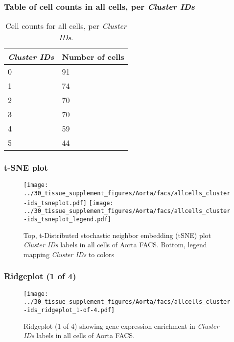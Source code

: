 \subsubsection{Table of cell counts in all cells, per \emph{Cluster IDs}}\begin{table}[h]
\centering
\label{my-label}
\begin{tabular}{@{}ll@{}}
\toprule

\emph{Cluster IDs}& Number of cells \\ \midrule
0 & 91 \\

1 & 74 \\

2 & 70 \\

3 & 70 \\

4 & 59 \\

5 & 44 \\
\bottomrule
\end{tabular}
\caption{Cell counts for all cells, per \emph{Cluster IDs}.}
\end{table}

\clearpage
\subsubsection{t-SNE plot}
\begin{figure}[h]
\centering
\texttt{[image: ../30\_tissue\_supplement\_figures/Aorta/facs/allcells\_cluster-ids\_tsneplot.pdf]}
\texttt{[image: ../30\_tissue\_supplement\_figures/Aorta/facs/allcells\_cluster-ids\_tsneplot\_legend.pdf]}
\caption{Top, t-Distributed stochastic neighbor embedding (tSNE) plot  \emph{Cluster IDs} labels in all cells of Aorta FACS. Bottom, legend mapping \emph{Cluster IDs} to colors}
\end{figure}


\clearpage

\subsubsection{Ridgeplot (1 of 4)}
\begin{figure}[h]
\centering
\texttt{[image: ../30\_tissue\_supplement\_figures/Aorta/facs/allcells\_cluster-ids\_ridgeplot\_1-of-4.pdf]}

\caption{ Ridgeplot (1 of 4)  showing gene expression enrichment in \emph{Cluster IDs} labels in all cells of Aorta FACS. }
\end{figure}


